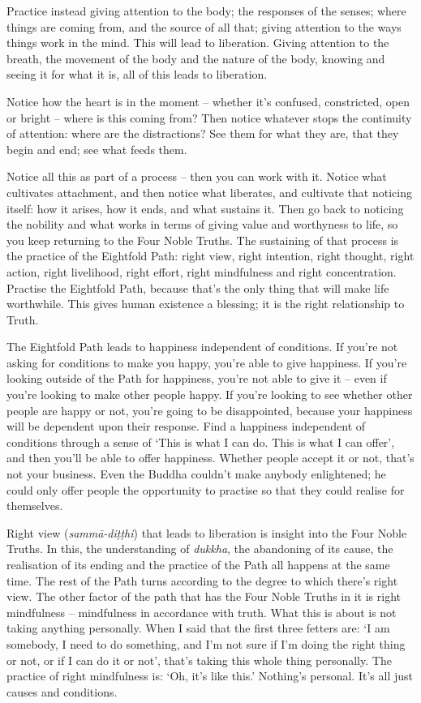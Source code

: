 Practice instead giving attention to the body; the responses of the senses;
where things are coming from, and the source of all that; giving attention to the
ways things work in the mind. This will lead to liberation. Giving attention to
the breath, the movement of the body and the nature of the body, knowing and
seeing it for what it is, all of this leads to liberation.

Notice how the heart is in the moment -- whether it's confused, constricted,
open or bright -- where is this coming from? Then notice whatever stops
the continuity of attention: where are the distractions? See them for what they
are, that they begin and end; see what feeds them.

Notice all this as part of a process -- then you can work with it. Notice what
cultivates attachment, and then notice what liberates, and cultivate that
noticing itself: how it arises, how it ends, and what sustains it. Then go back
to noticing the nobility and what works in terms of giving value and worthyness to life, so you keep
returning to the Four Noble Truths. The sustaining of that process is the practice of the
Eightfold Path: right view, right intention, right thought, right action, right
livelihood, right effort, right mindfulness and right concentration. Practise
the Eightfold Path, because that's the only thing that will make life
worthwhile. This gives human existence a blessing; it is the right relationship
to Truth.

The Eightfold Path leads to happiness independent of conditions. If you're not
asking for conditions to make you happy, you're able to give happiness. If
you're looking outside of the Path for happiness, you're not able to give it --
even if you're looking to make other people happy. If you're looking to see
whether other people are happy or not, you're going to be disappointed, because
your happiness will be dependent upon their response. Find a happiness
independent of conditions through a sense of `This is what I can do. This is
what I can offer', and then you'll be able to offer happiness. Whether people
accept it or not, that's not your business. Even the Buddha couldn't make
anybody enlightened; he could only offer people the opportunity to practise so
that they could realise for themselves.

Right view (\emph{sammā-diṭṭhi}) that leads to liberation is insight
into the Four Noble Truths. In this, the understanding of \emph{dukkha}, the
abandoning of its cause, the realisation of its ending and the practice of the
Path all happens at the same time. The rest of the Path turns according to the
degree to which there's right view. The other factor of the path that has the
Four Noble Truths in it is right mindfulness -- mindfulness in accordance with
truth. What this is about is not taking anything personally. When I said that
the first three fetters are: `I am somebody, I need to do something, and I'm not
sure if I'm doing the right thing or not, or if I can do it or not', that's
taking this whole thing personally. The practice of right mindfulness is: `Oh,
it's like this.' Nothing's personal. It's all just causes and conditions.

